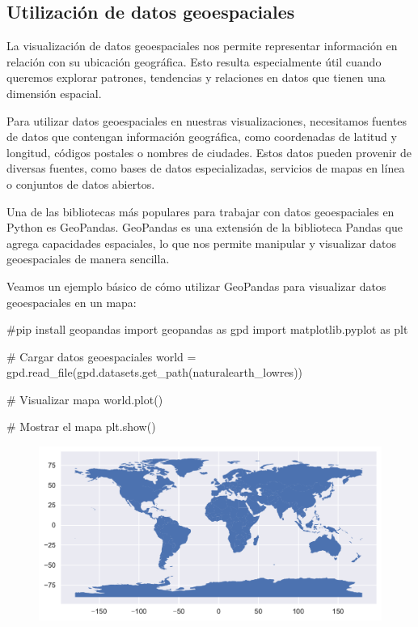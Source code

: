 \documentclass[
  a4paper,
]{article}
\newenvironment{Shaded}{}{}
\newcommand{\CommentTok}[1]{\textcolor[rgb]{0.42,0.45,0.49}{#1}}
\newcommand{\ImportTok}[1]{\textcolor[rgb]{0.01,0.18,0.38}{#1}}
\newcommand{\NormalTok}[1]{\textcolor[rgb]{0.14,0.16,0.18}{#1}}
\newcommand{\OperatorTok}[1]{\textcolor[rgb]{0.14,0.16,0.18}{#1}}
\newcommand{\StringTok}[1]{\textcolor[rgb]{0.01,0.18,0.38}{#1}}
\begin{document}
\hypertarget{utilizaciuxf3n-de-datos-geoespaciales}{%
\subsection{Utilización de datos
geoespaciales}\label{utilizaciuxf3n-de-datos-geoespaciales}}

La visualización de datos geoespaciales nos permite representar
información en relación con su ubicación geográfica. Esto resulta
especialmente útil cuando queremos explorar patrones, tendencias y
relaciones en datos que tienen una dimensión espacial.

Para utilizar datos geoespaciales en nuestras visualizaciones,
necesitamos fuentes de datos que contengan información geográfica, como
coordenadas de latitud y longitud, códigos postales o nombres de
ciudades. Estos datos pueden provenir de diversas fuentes, como bases de
datos especializadas, servicios de mapas en línea o conjuntos de datos
abiertos.

Una de las bibliotecas más populares para trabajar con datos
geoespaciales en Python es GeoPandas. GeoPandas es una extensión de la
biblioteca Pandas que agrega capacidades espaciales, lo que nos permite
manipular y visualizar datos geoespaciales de manera sencilla.

Veamos un ejemplo básico de cómo utilizar GeoPandas para visualizar
datos geoespaciales en un mapa:

\begin{Shaded}
\begin{Highlighting}[]
\CommentTok{\#pip install geopandas}
\ImportTok{import}\NormalTok{ geopandas }\ImportTok{as}\NormalTok{ gpd}
\ImportTok{import}\NormalTok{ matplotlib.pyplot }\ImportTok{as}\NormalTok{ plt}

\CommentTok{\# Cargar datos geoespaciales}
\NormalTok{world }\OperatorTok{=}\NormalTok{ gpd.read\_file(gpd.datasets.get\_path(}\StringTok{\textquotesingle{}naturalearth\_lowres\textquotesingle{}}\NormalTok{))}

\CommentTok{\# Visualizar mapa}
\NormalTok{world.plot()}

\CommentTok{\# Mostrar el mapa}
\NormalTok{plt.show()}
\end{Highlighting}
\end{Shaded}

\begin{figure}[H]

{\centering \includegraphics{index_files/figure-pdf/cell-24-output-1.pdf}

}

\end{figure}
\end{document}
